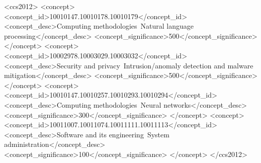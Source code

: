 \documentclass[sigconf]{acmart}
\begin{document}
\begin{CCSXML}
<ccs2012>
 <concept>
  <concept_id>10010147.10010178.10010179</concept_id>
  <concept_desc>Computing methodologies~Natural language processing</concept_desc>
  <concept_significance>500</concept_significance>
 </concept>
 <concept>
  <concept_id>10002978.10003029.10003032</concept_id>
  <concept_desc>Security and privacy~Intrusion/anomaly detection and malware mitigation</concept_desc>
  <concept_significance>500</concept_significance>
 </concept>
 <concept>
  <concept_id>10010147.10010257.10010293.10010294</concept_id>
  <concept_desc>Computing methodologies~Neural networks</concept_desc>
  <concept_significance>300</concept_significance>
 </concept>
 <concept>
  <concept_id>10011007.10011074.10011111.10011113</concept_id>
  <concept_desc>Software and its engineering~System administration</concept_desc>
  <concept_significance>100</concept_significance>
 </concept>
</ccs2012>
\end{CCSXML}





\maketitle
\end{document}
